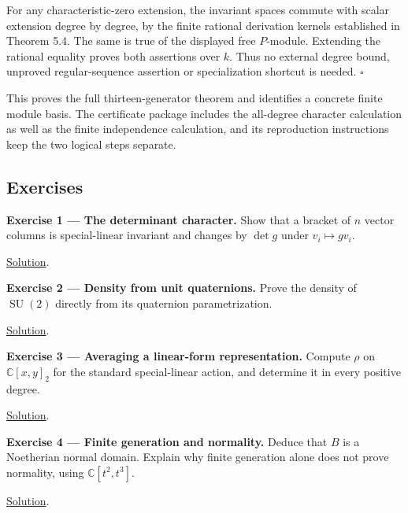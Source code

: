 \documentclass[
]{article}
\begin{document}
For any characteristic-zero extension, the invariant spaces commute with
scalar extension degree by degree, by the finite rational derivation
kernels established in Theorem 5.4. The same is true of the displayed
free \(P\)-module. Extending the rational equality proves both
assertions over \(k\). Thus no external degree bound, unproved
regular-sequence assertion or specialization shortcut is needed.
\(\square\)

This proves the full thirteen-generator theorem and identifies a
concrete finite module basis. The certificate package includes the
all-degree character calculation as well as the finite independence
calculation, and its reproduction instructions keep the two logical
steps separate.

\subsection{Exercises}\label{exercises}

\protect{}\label{exercise-1}{}

\textbf{Exercise 1 --- The determinant character.} Show that a bracket
of \(n\) vector columns is special-linear invariant and changes by
\(\det g\) under \(v_i\mapsto gv_i\).

\hyperref[solution-1]{Solution}.

\protect{}\label{exercise-2}{}

\textbf{Exercise 2 --- Density from unit quaternions.} Prove the density
of \(\operatorname{SU}(2)\) directly from its quaternion
parametrization.

\hyperref[solution-2]{Solution}.

\protect{}\label{exercise-3}{}

\textbf{Exercise 3 --- Averaging a linear-form representation.} Compute
\(\rho\) on \(\mathbb C [x,y]_2\) for the standard special-linear
action, and determine it in every positive degree.

\hyperref[solution-3]{Solution}.

\protect{}\label{exercise-4}{}

\textbf{Exercise 4 --- Finite generation and normality.} Deduce that
\(B\) is a Noetherian normal domain. Explain why finite generation alone
does not prove normality, using \(\mathbb C [t^2,t^3]\).

\hyperref[solution-4]{Solution}.

\protect{}\label{exercise-5}{}
\end{document}
